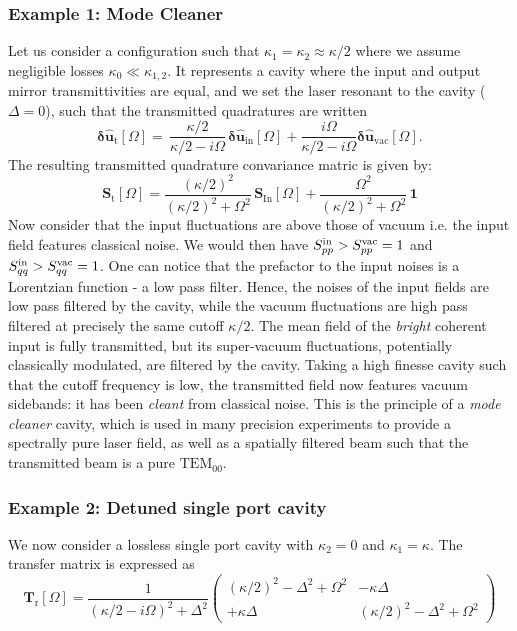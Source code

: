 \subsubsection{Example 1: Mode Cleaner }
Let us consider a configuration such that $\kappa_1 = \kappa_2 \approx \kappa/2$ where we assume negligible losses $\kappa_0 \ll \kappa_{1,2}$. It represents a cavity where the input and output mirror transmittivities are equal, and we set the laser resonant to the cavity ($\Delta=0$), such that the transmitted quadratures are written
\begin{equation}
  \mathbf{\delta \hat{u}_{\mathrm{t}}}[\Omega]  = \, \dfrac{ \kappa/2}{\kappa/2-i\Omega}  \, \mathbf{\delta \hat{u}_{\mathrm{in}}}[\Omega]   +  \dfrac{i\Omega}{\kappa/2-i\Omega}   \mathbf{\delta \hat{u}_{\mathrm{vac}}}[\Omega] .
\end{equation}
The resulting transmitted quadrature convariance matric is given by: 
\begin{equation}
  \mathbf{S}_{\mathrm{t}}[\Omega] =\frac{(\kappa/2)^2}{(\kappa/2)^2+\Omega^2} \, \mathbf{S}_{\mathrm{In}}[\Omega] +\frac{\Omega^2}{(\kappa/2)^2+\Omega^2}  \,  \mathbf{1}
\end{equation}
Now consider that the input fluctuations are above those of vacuum i.e. the input field features classical noise. We would then have $S_{pp}^{\rm in}> S_{pp}^{\rm vac}=1$ and $S_{qq}^{\rm in}> S_{qq}^{\rm vac}=1$. One can notice that the prefactor to the input noises is a Lorentzian function - a low pass filter. Hence, the noises of the input fields are low pass filtered by the cavity, while the vacuum fluctuations are high pass filtered at precisely the same cutoff $\kappa/2$. The mean field of the \textit{bright} coherent input is fully transmitted, but its super-vacuum fluctuations, potentially classically modulated, are filtered by the cavity. Taking a high finesse cavity such that the cutoff frequency is low, the transmitted field now features vacuum sidebands: it has been \textit{cleant} from classical noise. This is the principle of a \textit{mode cleaner} cavity, which is used in many precision experiments to provide a spectrally pure laser field, as well as a spatially filtered beam such that the transmitted beam is a pure $\mathrm{TEM}_{00}$.\\


\subsubsection{Example 2: Detuned single port cavity }
We now consider a lossless single port cavity with $\kappa_2 = 0$ and $\kappa_1 = \kappa$. The transfer matrix is expressed as 
\begin{equation}
  \mathbf{T}_{\mathrm{r}}[\Omega]=  \frac{1}{(\kappa/2 - i\Omega)^{2}+\Delta^{2}}
\begin{pmatrix}
     (\kappa/2)^2 - \Delta^2 + \Omega^2  & - \kappa \Delta  \\[6pt]
    + \kappa \Delta  & ( \kappa/2)^2 - \Delta^2 + \Omega^2 
\end{pmatrix}
\end{equation}

